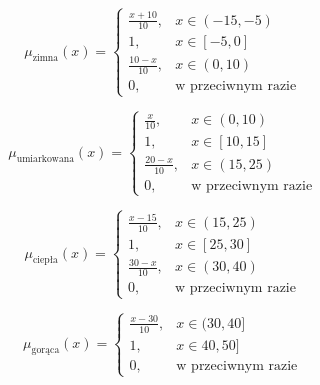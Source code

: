 \documentclass{article}
\begin{document}
\begin{enumerate}
                \begin{equation}
                   \mu_{\text{zimna}}(x) =
                    \begin{cases}
                    \frac{x + 10}{10}, & x \in (-15, -5) \\
                    1, & x \in [-5, 0] \\
                    \frac{10 - x}{10}, & x \in (0, 10) \\
                    0, & \text{w przeciwnym razie}
                    \end{cases}
                \end{equation}

                \begin{equation}
                    \mu_{\text{umiarkowana}}(x) =
                    \begin{cases}
                    \frac{x}{10}, & x \in (0, 10) \\
                    1, & x \in [10, 15] \\
                    \frac{20 - x}{10}, & x \in (15, 25) \\
                    0, & \text{w przeciwnym razie}
                    \end{cases}
                \end{equation}

                \begin{equation}
                    \mu_{\text{ciepła}}(x) =
                    \begin{cases}
                    \frac{x - 15}{10}, & x \in (15, 25) \\
                    1, & x \in [25, 30] \\
                    \frac{30 - x}{10}, & x \in (30, 40) \\
                    0, & \text{w przeciwnym razie}
                    \end{cases}
                \end{equation}

                \begin{equation}
                    \mu_{\text{gorąca}}(x) =
                    \begin{cases}
                    \frac{x - 30}{10}, & x \in (30, 40] \\
                    1, & x \in 40, 50] \\
                    0, & \text{w przeciwnym razie}
                    \end{cases}
                \end{equation}


\end{enumerate}
\end{document}
